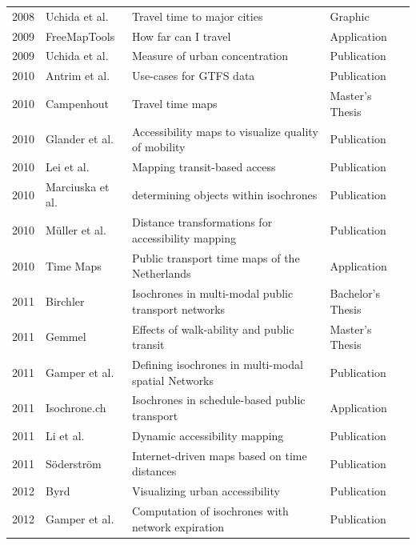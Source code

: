 \begin{table}[htp]
\begin{tabular}{r|l|l|l}
      2008 & Uchida et al. \cite{Uchida2008} & Travel time to major cities  & Graphic  \\
      2009 & FreeMapTools \cite{Freemaptools} & How far can I travel  & Application  \\
      2009 & Uchida et al. \cite{uchida2009agglomeration} & Measure of urban concentration  & Publication  \\
      2010 & Antrim et al. \cite{antrim2013many} & Use-cases for GTFS data & Publication  \\
      2010 & Campenhout \cite{van2010travel} & Travel time maps  & Master's Thesis  \\
      2010 & Glander et al. \cite{Glander2010} & Accessibility maps to visualize quality of mobility  &  Publication \\
      2010 & Lei et al. \cite{lei2010mapping} & Mapping transit-based access  & Publication  \\
      2010 & Marciuska et al. \cite{marciuska2010determining} & determining objects within isochrones  & Publication  \\
      2010 & Müller et al. \cite{Mueller2010} & Distance transformations for accessibility mapping  &  Publication \\
      2010 & Time Maps \cite{TimeMaps} & Public transport time maps of the Netherlands & Application  \\
      2011 & Birchler \cite{birchler2011computing} & Isochrones in multi-modal public transport networks  & Bachelor's Thesis  \\
      2011 & Gemmel \cite{gemmel2012hedonic} &  Effects of walk-ability and public transit & Master's Thesis  \\
      2011 & Gamper et al. \cite{gamper2011defining} & Defining isochrones in multi-modal spatial Networks & Publication  \\
      2011 & Isochrone.ch \cite{IsochroneCh}  & Isochrones in schedule-based public transport  & Application  \\
      2011 & Li et al. \cite{li2011dynamic} & Dynamic accessibility mapping  & Publication  \\
      2011 & Söderström \cite{soderstrom2011personal} & Internet-driven maps based on time distances  & Publication  \\
      2012 & Byrd \cite{Byrd2012} & Visualizing urban accessibility  & Publication  \\
      2012 & Gamper et al. \cite{gamper2012scalable} & Computation of isochrones with network expiration  & Publication  \\

\end{tabular}
\end{table}
